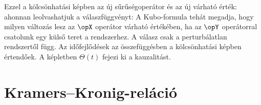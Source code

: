   Ezzel a kölcsönhatási képben az új sűrűségoperátor és az új várható érték:
  ahonnan leolvashatjuk a válaszfüggvényt:
  A Kubo-formula tehát megadja, hogy milyen változás lesz az $\opX$ operátor várható értékében, ha az $\opY$ operátorral csatolunk egy külső teret a rendszerhez.
   A válasz csak a perturbálatlan rendszertől függ.
   Az időfejlődések az összefüggésben a kölcsönhatási képben értendőek.
   A képletben $\Theta(t)$ fejezi ki a kauzalitást. 
  
 \section{Kramers--Kronig-reláció}
  
